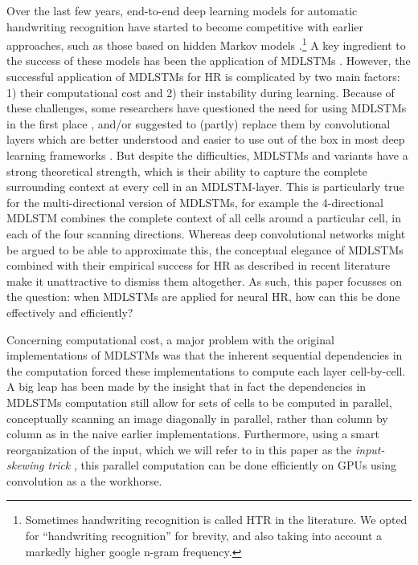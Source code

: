 \documentclass[conference]{IEEEtran}
\renewcommand{\ac}[1]{\gls{#1}}
\renewcommand{\acp}[1]{\glspl{#1}}
\begin{document}
Over the last few years, end-to-end deep learning models for automatic handwriting recognition \cite{Bluche2013FeatureEW,PhamEtAl2014,Voigtlaender2016} have started to become competitive with earlier approaches, such as those based on hidden Markov models \cite{MartiAndBunke:2001, BengioEtAl2004}.\footnote{Sometimes handwriting recognition is  called \ac{HTR} in the literature. We opted for ``handwriting recognition'' for brevity, and also taking into account a markedly higher google n-gram frequency.}
A key ingredient to the success of these models has been the application of \acp{MDLSTM} \cite{mdlstmsGraves2007}.
However, the successful application of \acp{MDLSTM} for \ac{HR} is complicated by two main factors: 1) their computational 
cost and 2) their instability during learning. Because of these challenges, some researchers have questioned the need for using 
\acp{MDLSTM} in the first place \cite{Puigcerver2017}, and/or suggested to (partly) replace them by convolutional layers which are better understood 
and easier to use out of the box in most deep learning frameworks \cite{CarbonellEtAl2018}.
But despite the difficulties, \acp{MDLSTM} and variants have a strong theoretical strength, 
which is their ability to capture the complete surrounding context at every cell in an \ac{MDLSTM}-layer. This is particularly true 
for the multi-directional version of \acp{MDLSTM}, for example the 4-directional \ac{MDLSTM} combines the complete context of all 
cells around a particular cell, in each of the four scanning directions. Whereas deep convolutional networks might be argued to be able
to approximate this, the conceptual elegance of \acp{MDLSTM} combined with their empirical success for \ac{HR}
as described in recent literature \cite{PhamEtAl2014,Voigtlaender2016} make it unattractive to dismiss them altogether. 
As such, this paper focusses on the question: when MDLSTMs are applied for neural \ac{HR}, 
how can this be done effectively and efficiently?

Concerning computational cost, a major problem with the original implementations of \acp{MDLSTM} was that 
the inherent sequential dependencies in the computation forced these implementations to compute each layer cell-by-cell.
A big leap has been made by the insight that in fact the dependencies in \acp{MDLSTM} computation still allow for 
sets of cells to be computed in parallel, conceptually scanning an image diagonally in parallel, rather than column by column 
as in the naive earlier implementations. Furthermore, using a smart reorganization 
of the input, which we will refer to in this paper as the \emph{input-skewing trick} \cite{VanDenOord:2016:PixelRecurrentNeuralNetworks}, this parallel computation can be done efficiently 
on GPUs using convolution as a the workhorse. 
\end{document}
